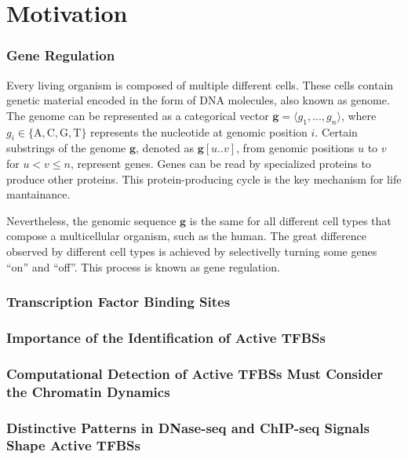\section{Motivation}
\label{sec:problem.motivation}

\subsubsection{Gene Regulation}

Every living organism is composed of multiple different cells. These cells contain genetic material encoded in the form of DNA molecules, also known as genome. The genome can be represented as a categorical vector $\mathbf{g} = \langle g_1, ..., g_n \rangle$, where $g_i \in \{\text{A},\text{C},\text{G},\text{T}\}$ represents the nucleotide at genomic position $i$. Certain substrings of the genome $\mathbf{g}$, denoted as $\mathbf{g}[u..v]$, from genomic positions $u$ to $v$ for $u < v \leq n$, represent genes. Genes can be read by specialized proteins to produce other proteins. This protein-producing cycle is the key mechanism for life mantainance.

Nevertheless, the genomic sequence $\mathbf{g}$ is the same for all different cell types that compose a multicellular organism, such as the human. The great difference observed by different cell types is achieved by selectivelly turning some genes ``on'' and ``off''. This process is known as gene regulation. 

\subsubsection{Transcription Factor Binding Sites}



\subsubsection{Importance of the Identification of Active TFBSs}




\subsubsection{Computational Detection of Active TFBSs Must Consider the Chromatin Dynamics}



\subsubsection{Distinctive Patterns in DNase-seq and ChIP-seq Signals Shape Active TFBSs}


